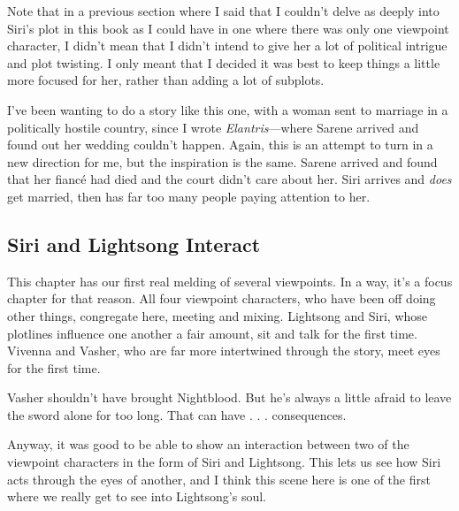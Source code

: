 Note that in a previous section where I said that I couldn’t delve as deeply into Siri’s plot in this book as I could have in one where there was only one viewpoint character, I didn’t mean that I didn’t intend to give her a lot of political intrigue and plot twisting. I only meant that I decided it was best to keep things a little more focused for her, rather than adding a lot of subplots.

I’ve been wanting to do a story like this one, with a woman sent to marriage in a politically hostile country, since I wrote \textit{Elantris}—where Sarene arrived and found out her wedding couldn’t happen. Again, this is an attempt to turn in a new direction for me, but the inspiration is the same. Sarene arrived and found that her fiancé had died and the court didn’t care about her. Siri arrives and \textit{does} get married, then has far too many people paying attention to her.

\subsection*{Siri and Lightsong Interact}

This chapter has our first real melding of several viewpoints. In a way, it’s a focus chapter for that reason. All four viewpoint characters, who have been off doing other things, congregate here, meeting and mixing. Lightsong and Siri, whose plotlines influence one another a fair amount, sit and talk for the first time. Vivenna and Vasher, who are far more intertwined through the story, meet eyes for the first time.

Vasher shouldn’t have brought Nightblood. But he’s always a little afraid to leave the sword alone for too long. That can have . . . consequences.

Anyway, it was good to be able to show an interaction between two of the viewpoint characters in the form of Siri and Lightsong. This lets us see how Siri acts through the eyes of another, and I think this scene here is one of the first where we really get to see into Lightsong’s soul.



